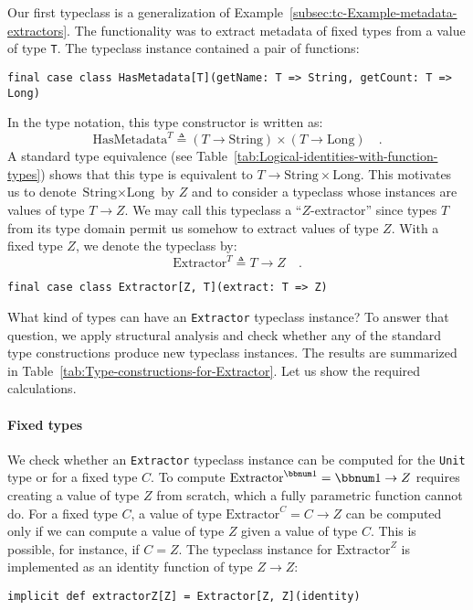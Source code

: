Our first typeclass is a generalization of Example~\ref{subsec:tc-Example-metadata-extractors}.
The functionality was to extract metadata of fixed types from a value
of type \lstinline!T!. The typeclass instance contained a pair of
functions:
\begin{lstlisting}
final case class HasMetadata[T](getName: T => String, getCount: T => Long)
\end{lstlisting}
In the type notation, this type constructor is written as:
\[
\text{HasMetadata}^{T}\triangleq(T\rightarrow\text{String})\times(T\rightarrow\text{Long})\quad.
\]
A standard type equivalence (see Table~\ref{tab:Logical-identities-with-function-types})
shows that this type is equivalent to $T\rightarrow\text{String}\times\text{Long}$.
This motivates us to denote $\text{String}\times\text{Long}$ by $Z$
and to consider a typeclass whose instances are values of type $T\rightarrow Z$.
We may call this typeclass a \textsf{``}$Z$-extractor\textsf{''}
since types $T$ from its type domain permit us somehow to extract
values of type $Z$. With a fixed type $Z$, we denote the typeclass
by:
\[
\text{Extractor}^{T}\triangleq T\rightarrow Z\quad.
\]
\begin{lstlisting}
final case class Extractor[Z, T](extract: T => Z)
\end{lstlisting}
What kind of types can have an \lstinline!Extractor! typeclass instance?
To answer that question, we apply structural analysis and check whether
any of the standard type constructions produce new typeclass instances.
The results are summarized in Table~\ref{tab:Type-constructions-for-Extractor}.
Let us show the required calculations.

\paragraph{Fixed types}

We check whether an \lstinline!Extractor! typeclass instance can
be computed for the \lstinline!Unit! type or for a fixed type $C$.
To compute $\text{Extractor}^{\bbnum 1}=\bbnum 1\rightarrow Z$ requires
creating a value of type $Z$ from scratch, which a fully parametric
function cannot do. For a fixed type $C$, a value of type $\text{Extractor}^{C}=C\rightarrow Z$
can be computed only if we can compute a value of type $Z$ given
a value of type $C$. This is possible, for instance, if $C=Z$. The
typeclass instance for $\text{Extractor}^{Z}$ is implemented as an
identity function of type $Z\rightarrow Z$:
\begin{lstlisting}
implicit def extractorZ[Z] = Extractor[Z, Z](identity)
\end{lstlisting}


